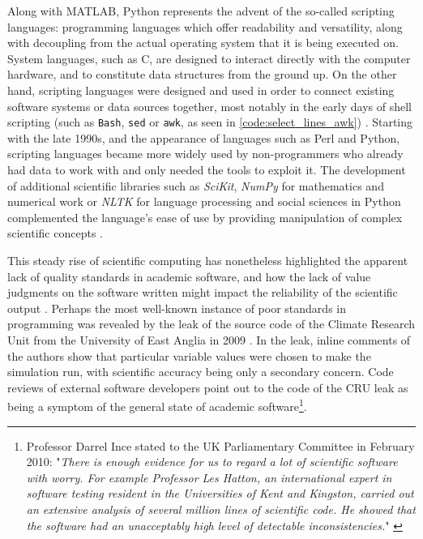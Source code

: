 Along with MATLAB, Python represents the advent of the so-called scripting languages: programming  languages which offer readability and versatility, along with decoupling from the actual operating system that it is being executed on. System languages, such as C, are designed to interact directly with the computer hardware, and to constitute data structures from the ground up. On the other hand, scripting languages were designed and used in order to connect existing software systems or data sources together, most notably in the early days of shell scripting (such as \lstinline{Bash}, \lstinline{sed} or \lstinline{awk}, as seen in \autoref{code:select_lines_awk}) \citep{ousterhout_scripting_1998}. Starting with the late 1990s, and the appearance of languages such as Perl and Python, scripting languages became more widely used by non-programmers who already had data to work with and only needed the tools to exploit it. The development of additional scientific libraries such as \emph{SciKit}, \emph{NumPy} for mathematics and numerical work or \emph{NLTK} for language processing and social sciences in Python complemented the language's ease of use by providing manipulation of complex scientific concepts \citep{millman_python_2011}.

This steady rise of scientific computing has nonetheless highlighted the apparent lack of quality standards in academic software, and how the lack of value judgments on the software written might impact the reliability of the scientific output \citep{hatton_how_1994}. Perhaps the most well-known instance of poor standards in programming was revealed by the leak of the source code of the Climate Research Unit from the University of East Anglia in 2009 \citep{merali_computational_2010}. In the leak, inline comments of the authors show that particular variable values were chosen to make the simulation run, with scientific accuracy being only a secondary concern. Code reviews of external software developers point out to the code of the CRU leak as being a symptom of the general state of academic software\footnote{Professor Darrel Ince stated to the UK Parliamentary Committee in February 2010: "\emph{There is enough evidence for us to regard a lot of scientific software with worry. For example Professor Les Hatton, an international expert in software testing resident in the Universities of Kent and Kingston, carried out an extensive analysis of several million lines of scientific code. He showed that the software had an unacceptably high level of detectable inconsistencies.}" \citep{committee_disclosure_2010}}.

